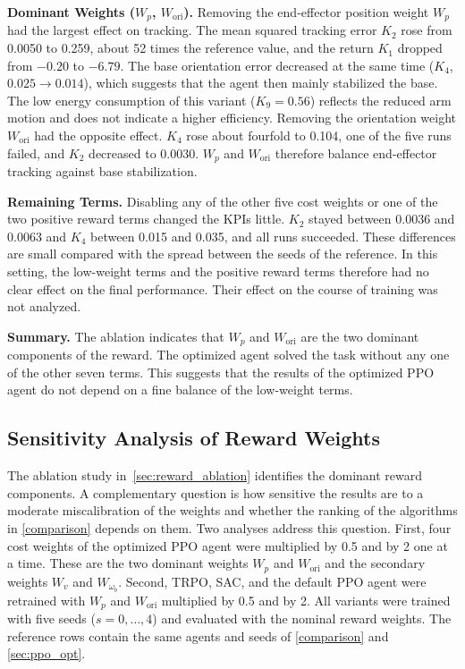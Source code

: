 \documentclass{ieeeaccess}
\begin{document}
\textbf{Dominant Weights ($W_p$, $W_{\mathrm{ori}}$).} Removing the end-effector position weight $W_p$ had
the largest effect on tracking. The mean squared tracking error $K_2$ rose from 0.0050 to 0.259, about 52
times the reference value, and the return $K_1$ dropped from $-0.20$ to $-6.79$. The base orientation error
decreased at the same time ($K_4$, $0.025 \to 0.014$), which suggests that the agent then mainly
stabilized the base. The low energy consumption of this variant ($K_9 = 0.56$) reflects the reduced arm
motion and does not indicate a higher efficiency. Removing the orientation weight $W_{\mathrm{ori}}$ had
the opposite effect. $K_4$ rose about fourfold to 0.104, one of the five runs failed, and $K_2$ decreased
to 0.0030. $W_p$ and $W_{\mathrm{ori}}$ therefore balance end-effector tracking against base
stabilization.

\textbf{Remaining Terms.} Disabling any of the other five cost weights or one of the two positive reward
terms changed the KPIs little. $K_2$ stayed between 0.0036 and 0.0063 and $K_4$ between 0.015 and 0.035,
and all runs succeeded. These differences are small compared with the spread between the seeds of the
reference. In this setting, the low-weight terms and the positive reward terms therefore had no clear
effect on the final performance. Their effect on the course of training was not analyzed.

\textbf{Summary.} The ablation indicates that $W_p$ and $W_{\mathrm{ori}}$ are the two dominant components of
the reward. The optimized agent solved the task without any one of the other seven terms. This suggests
that the results of the optimized PPO agent do not depend on a fine balance of the low-weight terms.

\subsection{Sensitivity Analysis of Reward Weights}\label{sec:reward_sensitivity}
The ablation study in~\cref{sec:reward_ablation} identifies the dominant reward components. A
complementary question is how sensitive the results are to a moderate miscalibration of the weights and
whether the ranking of the algorithms in \cref{comparison} depends on them. Two analyses address this
question. First, four cost weights of the optimized PPO agent were multiplied by 0.5 and by 2 one at a
time. These are the two dominant weights $W_p$ and $W_{\mathrm{ori}}$ and the secondary weights $W_v$ and
$W_{\omega_b}$. Second, TRPO, SAC, and the default PPO agent were retrained with $W_p$ and
$W_{\mathrm{ori}}$ multiplied by 0.5 and by 2. All variants were trained with five seeds
($s = 0,\dots,4$) and evaluated with the nominal reward weights. The reference rows contain the same
agents and seeds of \cref{comparison} and \cref{sec:ppo_opt}.
\end{document}
